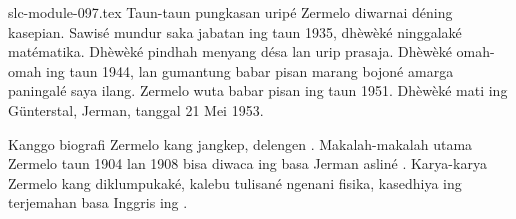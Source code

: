 \begin{filecontents*}[overwrite]{slc-module-097.tex}
Taun-taun pungkasan
uripé Zermelo
diwarnai déning
kasepian. Sawisé
mundur saka jabatan ing taun
1935, dhèwèké
ninggalaké matématika.
Dhèwèké pindhah
menyang désa lan
urip prasaja.
Dhèwèké omah-omah
ing taun 1944,
lan gumantung babar pisan
marang bojoné
amarga paningalé
saya ilang.
Zermelo wuta
babar pisan
ing taun 1951.
Dhèwèké mati
ing G\"{u}nterstal,
Jerman, tanggal
21 Mei 1953.

\begin{reading}
Kanggo biografi
Zermelo kang
jangkep, delengen
\citet{Ebbinghaus2015}.
Makalah-makalah
utama Zermelo
taun 1904 lan
1908 bisa diwaca
ing basa Jerman
asliné
\citep{Zermelo1904,Zermelo1908}.
Karya-karya
Zermelo kang
diklumpukaké,
kalebu tulisané
ngenani fisika,
kasedhiya ing
terjemahan
basa Inggris
ing
\citep{Ebbinghaus2010,Ebbinghaus2013}.
\end{reading}


\end{filecontents*}


